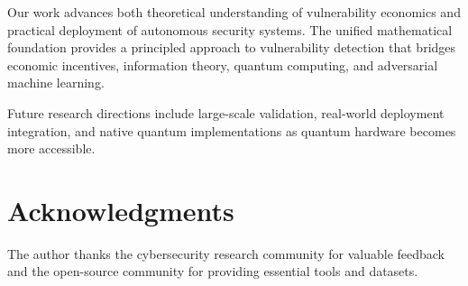 \documentclass[journal]{IEEEtran}
\begin{document}
Our work advances both theoretical understanding of vulnerability economics and practical deployment of autonomous security systems. The unified mathematical foundation provides a principled approach to vulnerability detection that bridges economic incentives, information theory, quantum computing, and adversarial machine learning.

Future research directions include large-scale validation, real-world deployment integration, and native quantum implementations as quantum hardware becomes more accessible.

\section*{Acknowledgments}

The author thanks the cybersecurity research community for valuable feedback and the open-source community for providing essential tools and datasets.



\end{document}
